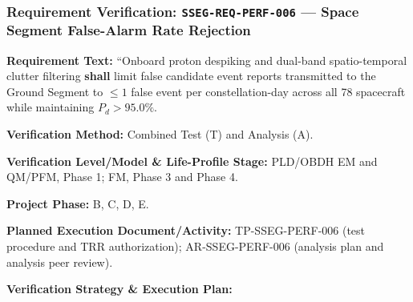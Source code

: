 \subsubsection{Requirement Verification: \texttt{SSEG-REQ-PERF-006} --- Space Segment False-Alarm Rate Rejection}
\label{ver:SSEG-REQ-PERF-006}
\textbf{Requirement Text:} ``Onboard proton despiking and dual-band spatio-temporal clutter filtering \textbf{shall} limit false candidate event reports transmitted to the Ground Segment to $\le 1$ false event per constellation-day across all 78 spacecraft while maintaining $P_d > 95.0\%$.
\par\textbf{Verification Method:} Combined Test (T) and Analysis (A).
\par\textbf{Verification Level/Model \& Life-Profile Stage:} PLD/OBDH EM and QM/PFM, Phase 1; FM, Phase 3 and Phase 4.
\par\textbf{Project Phase:} B, C, D, E.
\par\textbf{Planned Execution Document/Activity:} TP-SSEG-PERF-006 (test procedure and TRR authorization); AR-SSEG-PERF-006 (analysis plan and analysis peer review).
\par\textbf{Verification Strategy \& Execution Plan:}

